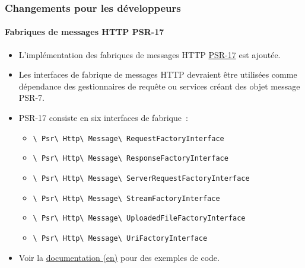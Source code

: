 
\begin{frame}[fragile]
	\frametitle{Changements pour les développeurs}
	\framesubtitle{Fabriques de messages HTTP PSR-17}

	\begin{itemize}
		\item L'implémentation des fabriques de messages HTTP
			\href{https://www.php-fig.org/psr/psr-17/}{PSR-17} est ajoutée.
		\item Les interfaces de fabrique de messages HTTP devraient être
			utilisées comme dépendance des gestionnaires de requête ou services
			créant des objet message PSR-7.
		\item PSR-17 consiste en six interfaces de fabrique~:

			\begin{itemize}\smaller
				\item \texttt{\textbackslash
					Psr\textbackslash
					Http\textbackslash
					Message\textbackslash
					RequestFactoryInterface}
				\item \texttt{\textbackslash
					Psr\textbackslash
					Http\textbackslash
					Message\textbackslash
					ResponseFactoryInterface}
				\item \texttt{\textbackslash
					Psr\textbackslash
					Http\textbackslash
					Message\textbackslash
					ServerRequestFactoryInterface}
				\item \texttt{\textbackslash
					Psr\textbackslash
					Http\textbackslash
					Message\textbackslash
					StreamFactoryInterface}
				\item \texttt{\textbackslash
					Psr\textbackslash
					Http\textbackslash
					Message\textbackslash
					UploadedFileFactoryInterface}
				\item \texttt{\textbackslash
					Psr\textbackslash
					Http\textbackslash
					Message\textbackslash
					UriFactoryInterface}

			\end{itemize}\normalsize

		\item Voir la
			\href{https://docs.typo3.org/c/typo3/cms-core/master/en-us/Changelog/10.1/Feature-89018-ProvideImplementationForPSR-17HTTPMessageFactories.html}{documentation (en)}
			pour des exemples de code.

	\end{itemize}

\end{frame}

